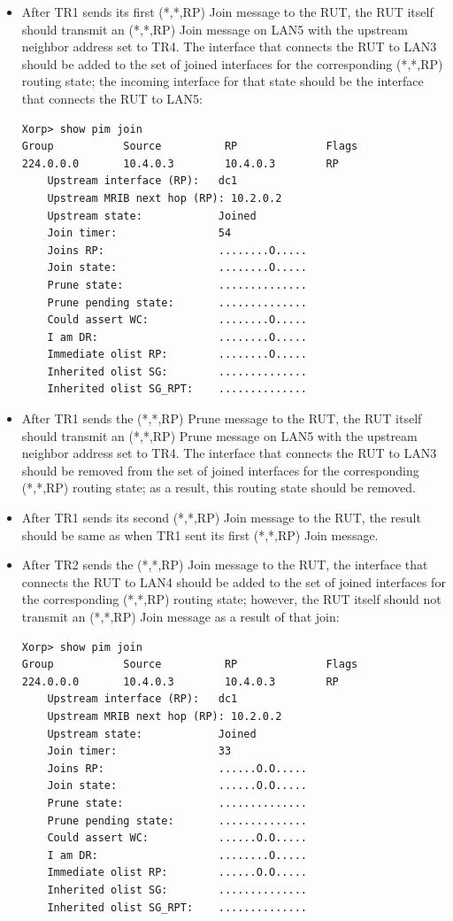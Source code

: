 \documentclass[11pt]{report}
\begin{document}
\begin{itemize}

  \item After TR1 sends its first (*,*,RP) Join message to the RUT, the RUT
  itself should transmit an (*,*,RP) Join message on LAN5 with the upstream
  neighbor address set to TR4. The interface that connects the RUT to LAN3
  should be added to the set of joined interfaces for the corresponding
  (*,*,RP) routing state; the incoming interface for that state should be the
  interface that connects the RUT to LAN5:

\begin{verbatim}
Xorp> show pim join 
Group           Source          RP              Flags
224.0.0.0       10.4.0.3        10.4.0.3        RP   
    Upstream interface (RP):   dc1
    Upstream MRIB next hop (RP): 10.2.0.2
    Upstream state:            Joined 
    Join timer:                54
    Joins RP:                  ........O.....
    Join state:                ........O.....
    Prune state:               ..............
    Prune pending state:       ..............
    Could assert WC:           ........O.....
    I am DR:                   ........O.....
    Immediate olist RP:        ........O.....
    Inherited olist SG:        ..............
    Inherited olist SG_RPT:    ..............
\end{verbatim}

  \item After TR1 sends the (*,*,RP) Prune message to the RUT, the RUT itself
  should transmit an (*,*,RP) Prune message on LAN5 with the upstream neighbor
  address set to TR4. The interface that connects the RUT to LAN3 should be
  removed from the set of joined interfaces for the corresponding (*,*,RP)
  routing state; as a result, this routing state should be removed.

  \item After TR1 sends its second (*,*,RP) Join message to the RUT, the
  result should be same as when TR1 sent its first (*,*,RP) Join message.

  \item After TR2 sends the (*,*,RP) Join message to the RUT, the interface
  that connects the RUT to LAN4 should be added to the set of joined
  interfaces for the corresponding (*,*,RP) routing state; however, the RUT
  itself should not transmit an (*,*,RP) Join message as a result of that
  join:

\begin{verbatim}
Xorp> show pim join 
Group           Source          RP              Flags
224.0.0.0       10.4.0.3        10.4.0.3        RP   
    Upstream interface (RP):   dc1
    Upstream MRIB next hop (RP): 10.2.0.2
    Upstream state:            Joined 
    Join timer:                33
    Joins RP:                  ......O.O.....
    Join state:                ......O.O.....
    Prune state:               ..............
    Prune pending state:       ..............
    Could assert WC:           ......O.O.....
    I am DR:                   ........O.....
    Immediate olist RP:        ......O.O.....
    Inherited olist SG:        ..............
    Inherited olist SG_RPT:    ..............
\end{verbatim}


\end{itemize}
\end{document}
